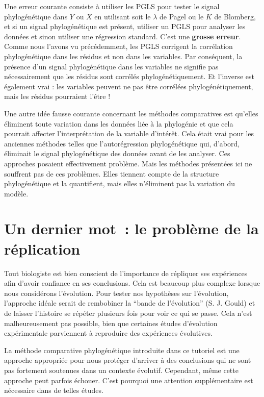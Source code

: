 \documentclass[
]{book}
\begin{document}
Une erreur courante consiste à utiliser les PGLS pour tester le signal phylogénétique dans \(Y\) ou \(X\) en utilisant soit le \(\lambda\) de Pagel ou le \(K\) de Blomberg, et si un signal phylogénétique est présent, utiliser un PGLS pour analyser les données et sinon utiliser une régression standard. C'est une \textbf{grosse erreur}. Comme nous l'avons vu précédemment, les PGLS corrigent la corrélation phylogénétique dans les résidus et non dans les variables. Par conséquent, la présence d'un signal phylogénétique dans les variables ne signifie pas nécessairement que les résidus sont corrélés phylogénétiquement. Et l'inverse est également vrai : les variables peuvent ne pas être corrélées phylogénétiquement, mais les résidus pourraient l'être !

Une autre idée fausse courante concernant les méthodes comparatives est qu'elles éliminent toute variation dans les données liée à la phylogénie et que cela pourrait affecter l'interprétation de la variable d'intérêt. Cela était vrai pour les anciennes méthodes telles que l'autorégression phylogénétique qui, d'abord, éliminait le signal phylogénétique des données avant de les analyser. Ces approches posaient effectivement problème. Mais les méthodes présentées ici ne souffrent pas de ces problèmes. Elles tiennent compte de la structure phylogénétique et la quantifient, mais elles n'éliminent pas la variation du modèle.

\chapter{Un dernier mot~: le problème de la réplication}\label{un-dernier-mot-le-probluxe8me-de-la-ruxe9plication}

Tout biologiste est bien conscient de l'importance de répliquer ses expériences afin d'avoir confiance en ses conclusions. Cela est beaucoup plus complexe lorsque nous considérons l'évolution. Pour tester nos hypothèses sur l'évolution, l'approche idéale serait de rembobiner la ``bande de l'évolution'' (S. J. Gould) et de laisser l'histoire se répéter plusieurs fois pour voir ce qui se passe. Cela n'est malheureusement pas possible, bien que certaines études d'évolution expérimentale parviennent à reproduire des expériences évolutives.

La méthode comparative phylogénétique introduite dans ce tutoriel est une approche appropriée pour nous protéger d'arriver à des conclusions qui ne sont pas fortement soutenues dans un contexte évolutif. Cependant, même cette approche peut parfois échouer. C'est pourquoi une attention supplémentaire est nécessaire dans de telles études.
\end{document}
